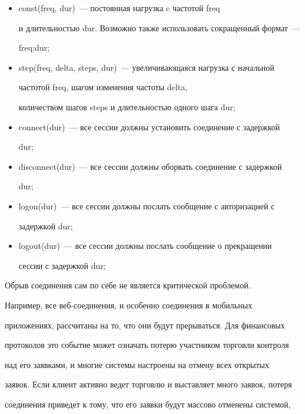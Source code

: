   \begin{itemize}


  \item {\sf  const(freq, dur)}~--- постоянная нагрузка c частотой {\sf  freq}


  и длительностью {\sf  dur}. Возможно также использовать сокращенный формат~---


  {\sf  freq:dur};


  \item {\sf  step(freq, delta, steps, dur)}~--- увеличивающаяся нагрузка с начальной


частотой {\sf  freq}, шагом изменения частоты {\sf  delta},


количеством шагов {\sf  steps} и длительностью одного шага {\sf  dur};


  \item {\sf  connect(dur)}~--- все сессии должны установить соединение с задержкой


{\sf  dur};


  \item {\sf  disconnect(dur)}~--- все сессии должны оборвать соединение с задержкой


{\sf  dur};


  \item {\sf  logon(dur)}~--- все сессии должны послать сообщение с авторизацией с


задержкой {\sf  dur};


  \item {\sf  logout(dur)}~--- все сессии должны послать сообщение о прекращении


сессии с задержкой {\sf  dur};


  \end{itemize}





  Обрыв соединения сам по себе не является критической проблемой.


Например, все веб-со\-еди\-не\-ния, и особенно соединения в мобильных


приложениях, рассчитаны на то, что они будут прерываться. Для финансовых


протоколов это событие может означать потерю участником торговли контроля


над его заявками, и многие системы настроены на отмену всех открытых


заявок. Если клиент активно ведет торговлю и выставляет много заявок, потеря


соединения приведет к тому, что его заявки будут массово отменены системой,


